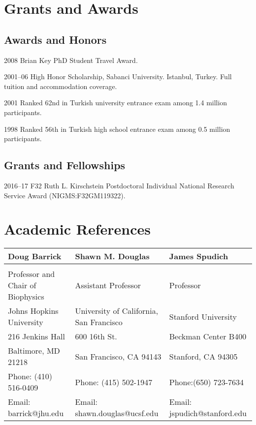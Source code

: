 \documentclass[12pt,letterpaper]{report}
\begin{document}
    \section*{Grants and Awards}

    \subsection*{Awards and Honors}

    \begin{tablist}

        \item[2008] \tab{}Brian Key PhD Student Travel Award.
        \item[2001--06] \tab{}High Honor Scholarship, Sabanci University. Istanbul, Turkey. Full tuition and accommodation coverage.
        \item[2001] \tab{}Ranked 62nd in Turkish university entrance exam among 1.4 million participants.
        \item[1998] \tab{}Ranked 56th in Turkish high school entrance exam among 0.5 million participants.

    \end{tablist}

    \subsection*{Grants and Fellowships}

    \begin{tablist}

        \item[2016--17] \tab{} F32 Ruth L. Kirschstein Postdoctoral Individual National Research Service Award (NIGMS:F32GM119322). 

    \end{tablist}

    \section*{Academic References}

    \begin{tabular}{lll}
        Doug Barrick&  Shawn M. Douglas & James Spudich \\
        \hline \\
        Professor and Chair of Biophysics  & Assistant Professor & Professor \\
        Johns Hopkins University  & University of California, San Francisco & Stanford University \\
        216 Jenkins Hall  & 600 16th St. & Beckman Center B400 \\
        Baltimore, MD 21218  & San Francisco, CA 94143 & Stanford, CA 94305 \\
        Phone: (410) 516-0409 & Phone: (415) 502-1947 & Phone:(650) 723-7634\\
        Email: barrick@jhu.edu  & Email: shawn.douglas@ucsf.edu & Email: jspudich@stanford.edu

    \end{tabular}
\end{document}
